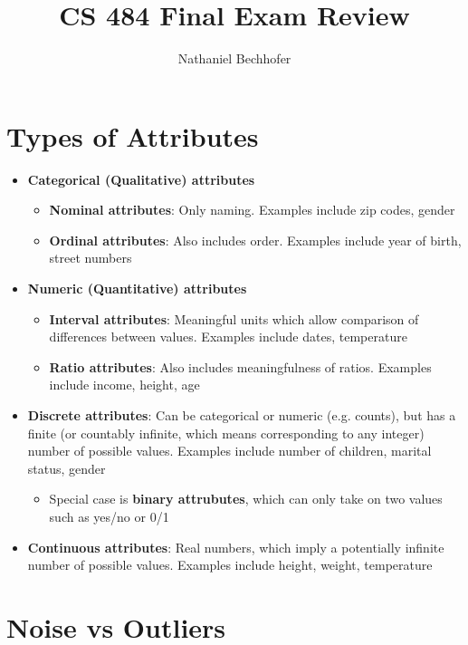 \documentclass[12pt]{amsart}
\title{CS 484 Final Exam Review}
\author{Nathaniel Bechhofer}
\begin{document}
\maketitle


\section{Types of Attributes}

\begin{itemize}
\item \textbf{Categorical (Qualitative) attributes}
\begin{itemize}
\item \textbf{Nominal attributes}: Only naming. Examples include zip codes, gender
\item \textbf{Ordinal attributes}: Also includes order. Examples include year of birth, street numbers
\end{itemize}
\item \textbf{Numeric (Quantitative) attributes}
\begin{itemize}
\item \textbf{Interval attributes}: Meaningful units which allow comparison of differences between values. Examples include dates, temperature
\item \textbf{Ratio attributes}: Also includes meaningfulness of ratios. Examples include income, height, age
\end{itemize}
\end{itemize}

\begin{itemize}
\item \textbf{Discrete attributes}: Can be categorical or numeric (e.g. counts), but has a finite (or countably infinite, which means corresponding to any integer) number of possible values. Examples include number of children, marital status, gender
\begin{itemize}
\item Special case is \textbf{binary attrubutes}, which can only take on two values such as yes/no or 0/1
\end{itemize}
\item \textbf{Continuous attributes}: Real numbers, which imply a potentially infinite number of possible values. Examples include height, weight, temperature
\end{itemize}

\section{Noise vs Outliers}
\end{document}
